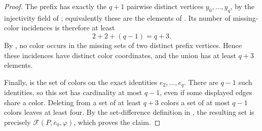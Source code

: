 \begin{proof}
The prefix has exactly the \(q+1\) pairwise distinct vertices
\(y_0,\ldots,y_q\), by the injectivity field of
; equivalently these are the elements of
.  Its number of missing-color incidences is
therefore at least
\[
  2+2+(q-1)=q+3.
\]
By , no color occurs in the missing
sets of two distinct prefix vertices.  Hence these incidences have distinct
color coordinates, and the union  has at least
\(q+3\) elements.

Finally,  is the set of colors on the exact
identities \(e_2,\ldots,e_q\).  There are \(q-1\) such identities, so this
set has cardinality at most \(q-1\), even if some displayed edges share a
color.  Deleting from a set of at least \(q+3\) colors a set of at most
\(q-1\) colors leaves at least four.  By the set-difference definition in
, the resulting set is precisely
\(\mathcal F(P,e_0,\varphi)\), which proves the claim.
\end{proof}
